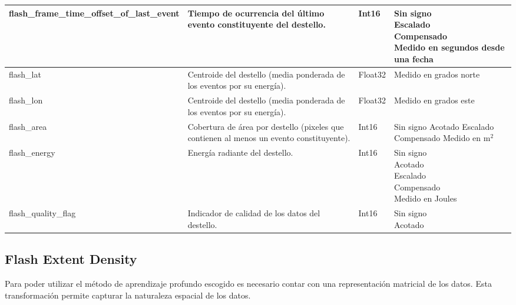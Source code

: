 \begin{table}[H]
\begin{tabular}{l|p{3cm}|p{1.15cm}|p{3.5cm}}
    flash\_frame\_time\_offset\_of\_last\_event &
    Tiempo de ocurrencia del último evento constituyente del destello. &
    Int16 &
    \parbox[t]{3.5cm}{Sin signo \\ Escalado \\ Compensado \\ Medido en segundos desde una fecha}\\ \hline

    flash\_lat &
    Centroide del destello (media ponderada de los eventos por su energía). &
    Float32 &
    \parbox[t]{3.5cm}{Medido en grados norte}\\ \hline

    flash\_lon &
    Centroide del destello (media ponderada de los eventos por su energía). &
    Float32 &
    \parbox[t]{3.5cm}{Medido en grados este}\\ \hline

    flash\_area &
    Cobertura de área por destello (pixeles que contienen al menos un evento constituyente). &
    Int16 &
    \parbox[t]{3.5cm}{Sin signo \\ Acotado \\ Escalado \\ Compensado \\ Medido en m$^2$}\\ \hline

    flash\_energy &
    Energía radiante del destello. &
    Int16 &
    \parbox[t]{3.5cm}{Sin signo \\ Acotado \\ Escalado \\ Compensado \\ Medido en Joules}\\ \hline

    flash\_quality\_flag &
    Indicador de calidad de los datos del destello. &
    Int16 &
    \parbox[t]{3.5cm}{Sin signo \\ Acotado }\\ 

  \end{tabular}
\end{table}

\subsection{Flash Extent Density}
Para poder utilizar el método de aprendizaje profundo escogido es necesario 
contar con una representación matricial de los datos. Esta transformación 
permite capturar la naturaleza espacial de los datos.

